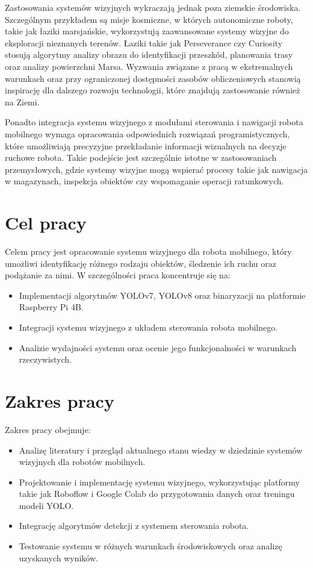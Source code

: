 \documentclass[a4paper,twoside,12pt]{book}
\begin{document}
Zastosowania systemów wizyjnych wykraczają jednak poza ziemskie środowiska. Szczególnym przykładem są misje kosmiczne, w których autonomiczne roboty, takie jak łaziki marsjańskie, wykorzystują zaawansowane systemy wizyjne do eksploracji nieznanych terenów. Łaziki takie jak Perseverance czy Curiosity stosują algorytmy analizy obrazu do identyfikacji przeszkód, planowania trasy oraz analizy powierzchni Marsa. Wyzwania związane z pracą w ekstremalnych warunkach oraz przy ograniczonej dostępności zasobów obliczeniowych stanowią inspirację dla dalszego rozwoju technologii, które znajdują zastosowanie również na Ziemi.

Ponadto integracja systemu wizyjnego z modułami sterowania i nawigacji robota mobilnego wymaga opracowania odpowiednich rozwiązań programistycznych, które umożliwiają precyzyjne przekładanie informacji wizualnych na decyzje ruchowe robota. Takie podejście jest szczególnie istotne w zastosowaniach przemysłowych, gdzie systemy wizyjne mogą wspierać procesy takie jak nawigacja w magazynach, inspekcja obiektów czy wspomaganie operacji ratunkowych.


\section{Cel pracy}
Celem pracy jest opracowanie systemu wizyjnego dla robota mobilnego, który umożliwi identyfikację różnego rodzaju obiektów, śledzenie ich ruchu oraz podążanie za nimi. W szczególności praca koncentruje się na:
\begin{itemize}
    \item Implementacji algorytmów YOLOv7, YOLOv8 oraz binaryzacji na platformie Raspberry Pi 4B.
    \item Integracji systemu wizyjnego z układem sterowania robota mobilnego.
    \item Analizie wydajności systemu oraz ocenie jego funkcjonalności w warunkach rzeczywistych.
\end{itemize}

\newpage

\section{Zakres pracy}

Zakres pracy obejmuje:
\begin{itemize}
    \item Analizę literatury i przegląd aktualnego stanu wiedzy w dziedzinie systemów wizyjnych dla robotów mobilnych.
    \item Projektowanie i implementację systemu wizyjnego, wykorzystując platformy takie jak Roboflow i Google Colab do przygotowania danych oraz treningu modeli YOLO.
    \item Integrację algorytmów detekcji z systemem sterowania robota.
    \item Testowanie systemu w różnych warunkach środowiskowych oraz analizę uzyskanych wyników.
\end{itemize}
\end{document}
